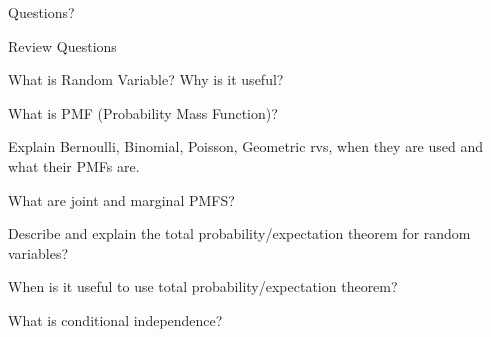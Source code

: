 \documentclass[fleqn,aspectratio=169]{beamer}
\begin{document}
\begin{frame}{}
\vspace{2cm}
\LARGE Questions?

\end{frame}

\begin{frame}{Review Questions}

\bce[1)]
\item What is Random Variable? Why is it useful?

\item What is PMF (Probability Mass Function)?

\item Explain Bernoulli, Binomial, Poisson, Geometric rvs, when they are used and what their PMFs are. 

\item What are joint and marginal PMFS?

\item Describe and explain the total probability/expectation theorem for random variables?

\item When is it useful to use total probability/expectation theorem?

\item What is conditional independence? 
\ece
\end{frame}
\end{document}
